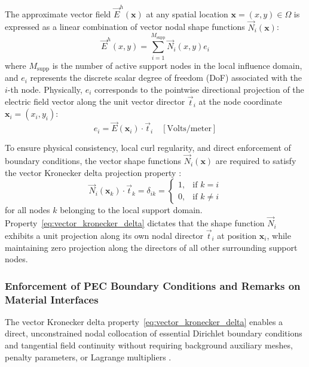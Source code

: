 \documentclass[preprint,12pt]{elsarticle}
\begin{document}
The approximate vector field $\vec{E}^h(\mathbf{x})$ at any spatial location $\mathbf{x} = (x, y) \in \Omega$ is expressed as a linear combination of vector nodal shape functions $\vec{N}_i(\mathbf{x})$:
\begin{equation}
    \vec{E}^h(x, y) = \sum_{i=1}^{M_{\text{supp}}} \vec{N}_i(x, y) e_i
    \label{eq:field_approx_vnmm}
\end{equation}
where $M_{\text{supp}}$ is the number of active support nodes in the local influence domain, and $e_i$ represents the discrete scalar degree of freedom (DoF) associated with the $i$-th node. Physically, $e_i$ corresponds to the pointwise directional projection of the electric field vector along the unit vector director $\vec{t}_i$ at the node coordinate $\mathbf{x}_i = (x_i, y_i)$:
\begin{equation}
    e_i = \vec{E}(\mathbf{x}_i) \cdot \vec{t}_i \quad [\text{Volts/meter}]
    \label{eq:dof_projection_definition}
\end{equation}

To ensure physical consistency, local curl regularity, and direct enforcement of boundary conditions, the vector shape functions $\vec{N}_i(\mathbf{x})$ are required to satisfy the vector Kronecker delta projection property \cite{lima2017edge, ortiz2021nodal}:
\begin{equation}
    \vec{N}_i(\mathbf{x}_k) \cdot \vec{t}_k = \delta_{ik} = \begin{cases} 1, & \text{if } k = i \\ 0, & \text{if } k \neq i \end{cases}
    \label{eq:vector_kronecker_delta}
\end{equation}
for all nodes $k$ belonging to the local support domain. Property~\eqref{eq:vector_kronecker_delta} dictates that the shape function $\vec{N}_i$ exhibits a unit projection along its own nodal director $\vec{t}_i$ at position $\mathbf{x}_i$, while maintaining zero projection along the directors of all other surrounding support nodes.

\subsubsection{Enforcement of PEC Boundary Conditions and Remarks on Material Interfaces}
The vector Kronecker delta property~\eqref{eq:vector_kronecker_delta} enables a direct, unconstrained nodal collocation of essential Dirichlet boundary conditions and tangential field continuity without requiring background auxiliary meshes, penalty parameters, or Lagrange multipliers \cite{goncalves2023vector, ortiz2021nodal}.
\end{document}
